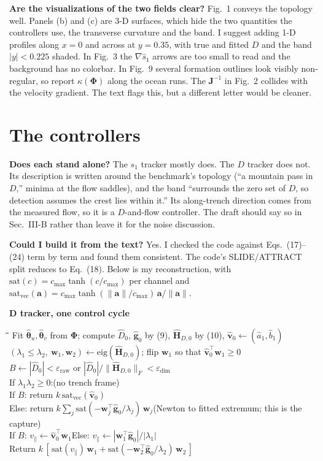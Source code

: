\documentclass[10.5pt]{article}
\newcommand{\shat}{\hat{s}_1}
\newcommand{\sat}{\mathrm{sat}}
\newcommand{\satv}{\mathrm{sat}_{\mathrm{vec}}}
\newenvironment{pcode}[1]
  {\par\smallskip\noindent\begin{lrbox}{\pcbox}\begin{minipage}{\dimexpr\linewidth-2\fboxsep}\small\textbf{#1}\par\smallskip\begin{tabbing}\hspace*{1.2em}\=\hspace*{1.2em}\=\hspace*{1.2em}\=\kill}
  {\end{tabbing}\end{minipage}\end{lrbox}\colorbox{boxgray}{\usebox{\pcbox}}\par\smallskip}
\begin{document}
\textbf{Are the visualizations of the two fields clear?} Fig.~1 conveys the topology well. Panels (b) and (c) are 3-D surfaces, which hide the two quantities the controllers use, the transverse curvature and the band. I suggest adding 1-D profiles along $x=0$ and across at $y=0.35$, with true and fitted $D$ and the band $|y|<0.225$ shaded. In Fig.~3 the $\nabla\shat$ arrows are too small to read and the background has no colorbar. In Fig.~9 several formation outlines look visibly non-regular, so report $\kappa(\boldsymbol\Phi)$ along the ocean runs. The $\mathbf J^{-1}$ in Fig.~2 collides with the velocity gradient. The text flags this, but a different letter would be cleaner.

\section{The controllers}

\textbf{Does each stand alone?} The $s_1$ tracker mostly does. The $D$ tracker does not. Its description is written around the benchmark's topology (``a mountain pass in $D$,'' minima at the flow saddles), and the band ``surrounds the zero set of $D$, so detection assumes the crest lies within it.'' Its along-trench direction comes from the measured flow, so it is a $D$-and-flow controller. The draft should say so in Sec.~III-B rather than leave it for the noise discussion.

\textbf{Could I build it from the text?} Yes. I checked the code against Eqs.~(17)--(24) term by term and found them consistent. The code's SLIDE/ATTRACT split reduces to Eq.~(18). Below is my reconstruction, with $\sat(c)=c_{\max}\tanh(c/c_{\max})$ per channel and $\satv(\mathbf a)=c_{\max}\tanh(\|\mathbf a\|/c_{\max})\,\mathbf a/\|\mathbf a\|$.

\begin{pcode}{D tracker, one control cycle}
Fit $\hat{\boldsymbol\theta}_u,\hat{\boldsymbol\theta}_v$ from $\boldsymbol\Phi$; compute $\hat D_0$, $\hat{\mathbf g}_0$ by (9), $\hat{\mathbf H}_{D,0}$ by (10), $\hat{\mathbf v}_0\leftarrow(\hat a_1,\hat b_1)$\\
$(\lambda_1\le\lambda_2,\ \mathbf w_1,\mathbf w_2)\leftarrow \mathrm{eig}(\hat{\mathbf H}_{D,0})$; flip $\mathbf w_1$ so that $\hat{\mathbf v}_0^\top\mathbf w_1\ge0$\\
$B\leftarrow |\hat D_0|<\varepsilon_{\mathrm{raw}}$ or $|\hat D_0|/\|\hat{\mathbf H}_{D,0}\|_F<\varepsilon_{\dim}$\\
If $\lambda_1\lambda_2\ge0$:\quad(no trench frame)\\
\>If $B$: return $k\,\satv(\hat{\mathbf v}_0)$\\
\>Else: return $k\sum_j \sat(-\mathbf w_j^\top\hat{\mathbf g}_0/\lambda_j)\,\mathbf w_j$\quad(Newton to fitted extremum; this is the capture)\\
If $B$: $v_\parallel\leftarrow\hat{\mathbf v}_0^\top\mathbf w_1$\quad Else: $v_\parallel\leftarrow|\mathbf w_1^\top\hat{\mathbf g}_0|/|\lambda_1|$\\
Return $k\,[\,\sat(v_\parallel)\,\mathbf w_1+\sat(-\mathbf w_2^\top\hat{\mathbf g}_0/\lambda_2)\,\mathbf w_2\,]$
\end{pcode}
\end{document}
